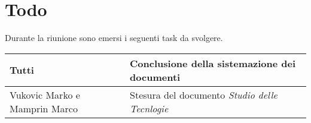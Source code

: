 \section{Todo}
Durante la riunione sono emersi i seguenti task da svolgere.

\begin{center}
  \begin{tabular}{|p{5cm}|p{7cm}|}
    \hline
    Tutti & Conclusione della sistemazione dei documenti \\ \hline
    Vukovic Marko e Mamprin Marco & Stesura del documento \textit{Studio delle Tecnlogie} \\ \hline
  \end{tabular}
\end{center}
